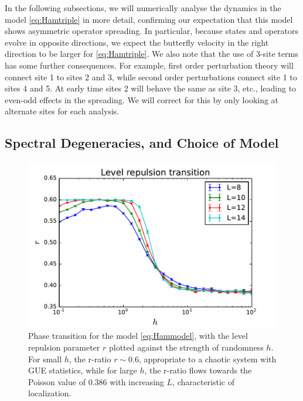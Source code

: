 \documentclass[aps,prx,reprint,superscriptaddress, longbibliography]{revtex4-1}
\begin{document}
In the following subsections, we will numerically analyse the dynamics in the model \eqref{eq:Hamtriple} in more detail, confirming our expectation that this model shows asymmetric operator spreading. In particular, because states and operators evolve in opposite directions, we expect the butterfly velocity in the right direction to be larger for \eqref{eq:Hamtriple}. We also note that the use of 3-site terms has some further consequences. For example, first order perturbation theory will connect site 1 to sites 2 and 3, while second order perturbations connect site 1 to sites 4 and 5. At early time sites 2 will behave the same as site 3, etc., leading to even-odd effects in the spreading. We will correct for this by only looking at alternate sites for each analysis. 

\subsection{Spectral Degeneracies, and Choice of Model}

\begin{figure}
	\includegraphics[width=\columnwidth]{levelrepultrans}
	\caption{Phase transition for the model \eqref{eq:Hammodel}, with the level repulsion parameter $ r$  plotted against the strength of randomness $h$. For small $h$, the r-ratio $ r  \sim 0.6$, appropriate to a chaotic system with GUE statistics, while for large $h$, the r-ratio flows towards the Poisson value of $0.386$ with increasing $L$, characteristic of localization.}
	\label{fig:levelrepultrans}
\end{figure}
\end{document}
